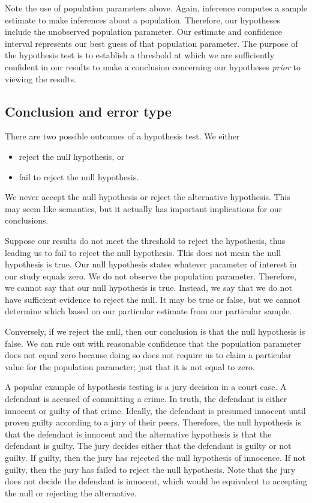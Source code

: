 \documentclass[
]{book}
\providecommand{\tightlist}{%
  \setlength{\itemsep}{0pt}\setlength{\parskip}{0pt}}
\begin{document}
Note the use of population parameters above. Again, inference computes a sample estimate to make inferences about a population. Therefore, our hypotheses include the unobserved population parameter. Our estimate and confidence interval represents our best guess of that population parameter. The purpose of the hypothesis test is to establish a threshold at which we are sufficiently confident in our results to make a conclusion concerning our hypotheses \emph{prior} to viewing the results.

\hypertarget{conclusion-and-error-type}{%
\subsection{Conclusion and error type}\label{conclusion-and-error-type}}

There are two possible outcomes of a hypothesis test. We either

\begin{itemize}
\tightlist
\item
  reject the null hypothesis, or
\item
  fail to reject the null hypothesis.
\end{itemize}

We never accept the null hypothesis or reject the alternative hypothesis. This may seem like semantics, but it actually has important implications for our conclusions.

Suppose our results do not meet the threshold to reject the hypothesis, thus leading us to fail to reject the null hypothesis. This does not mean the null hypothesis is true. Our null hypothesis states whatever parameter of interest in our study equals zero. We do not observe the population parameter. Therefore, we cannot say that our null hypothesis is true. Instead, we say that we do not have sufficient evidence to reject the null. It may be true or false, but we cannot determine which based on our particular estimate from our particular sample.

Conversely, if we reject the null, then our conclusion is that the null hypothesis is false. We can rule out with reasonable confidence that the population parameter does not equal zero because doing so does not require us to claim a particular value for the population parameter; just that it is not equal to zero.

A popular example of hypothesis testing is a jury decision in a court case. A defendant is accused of committing a crime. In truth, the defendant is either innocent or guilty of that crime. Ideally, the defendant is presumed innocent until proven guilty according to a jury of their peers. Therefore, the null hypothesis is that the defendant is innocent and the alternative hypothesis is that the defendant is guilty. The jury decides either that the defendant is guilty or not guilty. If guilty, then the jury has rejected the null hypothesis of innocence. If not guilty, then the jury has failed to reject the null hypothesis. Note that the jury does not decide the defendant is innocent, which would be equivalent to accepting the null or rejecting the alternative.
\end{document}
